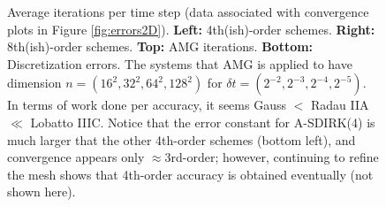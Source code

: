 \documentclass[review]{siamart}
\begin{document}
\begin{figure}[H]
{}
\caption{Average iterations per time step (data associated with convergence plots in Figure \ref{fig:errors2D}). \textbf{Left:} 4th(ish)-order schemes. \textbf{Right:} 8th(ish)-order schemes. \textbf{Top:} AMG iterations. \textbf{Bottom:} Discretization errors. The systems that AMG is applied to have dimension $n = (16^2, 32^2, 64^2, 128^2)$ for $\delta t = (2^{-2}, 2^{-3}, 2^{-4}, 2^{-5})$. In terms of work done per accuracy, it seems Gauss $<$ Radau IIA $\ll$ Lobatto IIIC. Notice that the error constant for A-SDIRK(4) is much larger that the other 4th-order schemes (bottom left), and convergence appears only $\approx$3rd-order; however, continuing to refine the mesh shows that 4th-order accuracy is obtained eventually (not shown here).
\label{fig:iters2D}
}
\end{figure}




% 
% 
\end{document}
